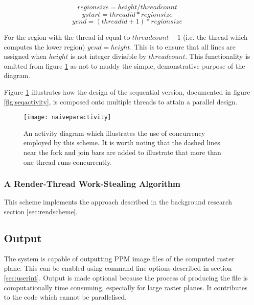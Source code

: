 \[regionsize = height / threadcount\]
\[ystart = threadid * regionsize\]
\[yend = (threadid + 1) * regionsize\]

For the region with the thread id equal to \(threadcount - 1\) (i.e. the thread which computes the lower region) 
\(yend = height\). This is to ensure that all lines are assigned when \(height\) is not integer divisible by \(threadcount\).
This functionality is omitted from figure \ref{fig:naiveparactivity} as not to muddy the simple, demonstrative purpose of the diagram.

Figure \ref{fig:naiveparactivity} illustrates how the design of the sequential version, documented in 
figure \ref{fig:seqactivity}, is composed onto multiple threads to attain a parallel design.

\begin{figure}[H]
\centering
\texttt{[image: naiveparactivity]}
\caption{
    An activity diagram which illustrates the use of concurrency employed by this 
    scheme. It is worth noting that the dashed lines near the fork and join bars 
    are added to illustrate that more than one thread runs concurrently.
}
\label{fig:naiveparactivity}
\end{figure}

\subsubsection*{A Render-Thread Work-Stealing Algorithm}

This scheme implements the approach described in the background research section \ref{sec:rendscheme}. 


\subsection{Output}
\label{sec:output}

The system is capable of outputting PPM image files of the computed raster plane. 
This can be enabled using command line options described in section \ref{sec:userint}.
Output is made optional because the process of producing the file is computationally time 
consuming, especially for large raster planes. It contributes to the code which 
cannot be parallelised.

